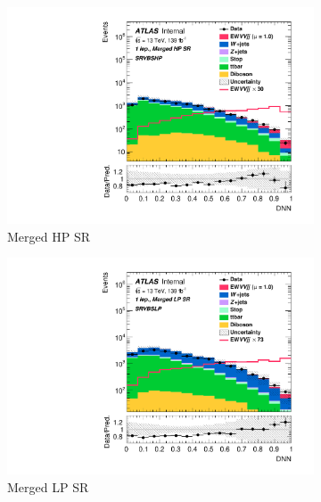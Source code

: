 \begin{figure}[ht]
    \centering
    \begin{subfigure}[b]{0.32\textwidth}
        \includegraphics[width=\textwidth]{figures/FitResults/prefit/Region_distDNN_DSRVBSHP_BMin0_J0_incJet1_L1_T0_incFat1_Y6051_incTag1_Fat1_Prefitlog.pdf}
        \caption{Merged HP SR}
    \end{subfigure}
    \begin{subfigure}[b]{0.32\textwidth}
        \includegraphics[width=\textwidth]{figures/FitResults/prefit/Region_distDNN_DSRVBSLP_BMin0_J0_incJet1_L1_T0_incFat1_Y6051_incTag1_Fat1_Prefitlog.pdf}
        \caption{Merged LP SR}
    \end{subfigure}
    \begin{subfigure}[b]{0.32\textwidth}

\end{subfigure}
\end{figure}
